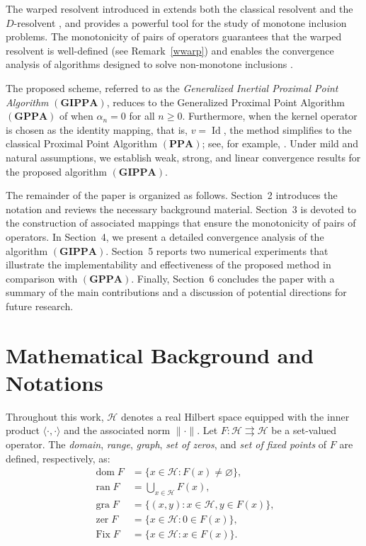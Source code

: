 \documentclass[11pt]{article}
\theoremstyle{definition}
\theoremstyle{definition}
\theoremstyle{definition}
\newcommand{\ran}{\ensuremath{\operatorname{ran}}}
\newcommand{\zer}{\ensuremath{\operatorname{zer}}}
\newcommand{\dom}{\ensuremath{\operatorname{dom}}}
\newcommand{\gra}{\ensuremath{\operatorname{gra}}}
\newcommand{\Fix}{\ensuremath{\operatorname{Fix}}}
\newcommand{\Id}{\ensuremath{\operatorname{Id}}}
\begin{document}
{
The warped resolvent introduced in \cite{bc} extends both the classical resolvent and the \(D\)-resolvent \cite{bbc}, and provides a powerful tool for the study of monotone inclusion problems. The monotonicity of pairs of operators guarantees that the warped resolvent is well-defined (see Remark~\ref{wwarp}) and enables the convergence analysis of algorithms designed to solve non-monotone inclusions \cite{LDT}.
}

{The proposed scheme, referred to as the \emph{Generalized Inertial Proximal Point Algorithm} \((\mathbf{GIPPA})\), reduces to the Generalized Proximal Point Algorithm \((\mathbf{GPPA})\) of \cite{LDT} when \(\alpha_n = 0\) for all \(n \geq 0\). Furthermore, when the kernel operator is chosen as the identity mapping, that is, \(v = \Id\), the method simplifies to the classical Proximal Point Algorithm \((\mathbf{PPA})\); see, for example, \cite{Rockafellar}. Under mild and natural assumptions, we establish weak, strong, and linear convergence results for the proposed algorithm \((\mathbf{GIPPA})\).
}

{The remainder of the paper is organized as follows. Section~2 introduces the notation and reviews the necessary background material. Section~3 is devoted to the construction of associated mappings that ensure the monotonicity of pairs of operators. In Section~4, we present a detailed convergence analysis of the algorithm \((\mathbf{GIPPA})\). Section~5 reports two numerical experiments that illustrate the implementability and effectiveness of the proposed method in comparison with \((\mathbf{GPPA})\). Finally, Section~6 concludes the paper with a summary of the main contributions and a discussion of potential directions for future research.}

\section{Mathematical Background and Notations}\label{sec2}

Throughout this work, \( \mathcal{H} \) denotes a real Hilbert space equipped with the inner product \( \langle \cdot, \cdot \rangle \) and the associated norm \( \|\cdot\| \). %
Let \( F : \mathcal{H} \rightrightarrows \mathcal{H} \) be a set-valued operator. The \emph{domain}, \emph{range}, \emph{graph}, \emph{set of zeros}, and \emph{set of fixed points} of \( F \) are defined, respectively, as:  
\begin{align*}
\dom F &= \{x \in \mathcal{H} : F(x) \neq \varnothing\}, \\
\ran F &= \bigcup_{x \in \mathcal{H}} F(x), \\
\gra F &= \{(x, y) : x \in \mathcal{H}, y \in F(x)\}, \\
\zer F &= \{x \in \mathcal{H} : 0 \in F(x)\}, \\
\Fix F &= \{x \in \mathcal{H} : x \in F(x)\}.
\end{align*}  
\end{document}
